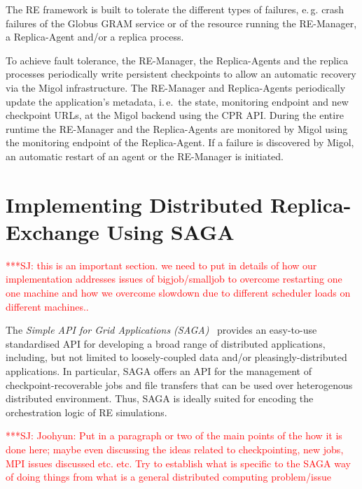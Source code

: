 \documentclass{rspublic}
\newcommand{\jhanote}[1]{ {\textcolor{red} { ***SJ: #1 }}}
\newcommand{\jhanote}[1]{}
\newcommand{\remanager}[1]{RE-Manager }
\begin{document}
The RE framework is built to tolerate the different types of failures,
e.\,g.\: crash failures of the Globus GRAM service or of the resource
running the RE-Manager, a Replica-Agent and/or a replica process.
        
To achieve fault tolerance, the RE-Manager, the Replica-Agents and the
replica processes periodically write persistent checkpoints to allow
an automatic recovery via the Migol infrastructure. The \remanager\
and Replica-Agents periodically update the application's metadata,
i.\,e.\ the state, monitoring endpoint and new checkpoint URLs, at the
Migol backend using the CPR API. During the entire runtime the
\remanager\ and the Replica-Agents are monitored by Migol using the
monitoring endpoint of the Replica-Agent. If a failure is discovered
by Migol, an automatic restart of an agent or the RE-Manager is
initiated.
                         
\section{Implementing Distributed Replica-Exchange Using SAGA}

\jhanote{this is an important section. we need to put in details of
  how our implementation addresses issues of bigjob/smalljob to
  overcome restarting one one machine and how we overcome slowdown due
  to different scheduler loads on different machines..}

The \emph{Simple API for Grid Applications (SAGA)}~\citep{saga_gfd90}
provides an easy-to-use standardised API for developing a broad range
of distributed applications, including, but not limited to
loosely-coupled data and/or pleasingly-distributed applications.  
In particular, SAGA offers an API for the management of
checkpoint-recoverable jobs and file transfers that can be used over
heterogenous distributed environment. Thus, SAGA is ideally suited for
encoding the orchestration logic of RE simulations.

\jhanote{Joohyun: Put in a paragraph or two of the main points of the
  how it is done here; maybe even discussing the ideas related to
  checkpointing, new jobs, MPI issues discussed etc. etc. Try to
  establish what is specific to the SAGA way of doing things from what
  is a general distributed computing problem/issue}
          
\end{document}
